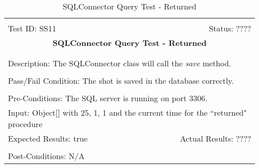 \documentclass[11pt]{article}
\begin{document}
\begin{center}
\begin{table}[H]
\begin{tabular}{|l r|}\hline&\\[-2mm]
	Test ID: SS11	&Status: ????\\[-3mm]
	\multicolumn{2}{|c|}{\textbf{\large{SQLConnector Query Test - Returned}}}\\&\\\hline&\\[-3mm]
	\multicolumn{2}{|p{\textwidth}|}{Description: The SQLConnector class will call the \textit{save} method.}\\[1mm]\hline&\\[-3mm]
	\multicolumn{2}{|p{\textwidth}|}{Pass/Fail Condition: The shot is saved in the database correctly.}\\[1mm]\hline&\\[-3mm]
	\multicolumn{2}{|p{\textwidth}|}{Pre-Conditions: The SQL server is running on port 3306.}\\[4mm]
	\multicolumn{2}{|p{\textwidth}|}{Input: Object[] with 25, 1, 1 and the current time for the ``returned" procedure}\\[2mm]\hline
	\multicolumn{1}{|p{0.49\textwidth}}{Expected Results: true}	&\multicolumn{1}{|p{0.45\textwidth}|}{Actual Results: ????}\\\hline&\\[-3mm]
	\multicolumn{2}{|p{\textwidth}|}{Post-Conditions: N/A}\\\hline
\end{tabular}
\caption{SQLConnector Query Test - Returned}
\end{table}
\end{center}
\end{document}
